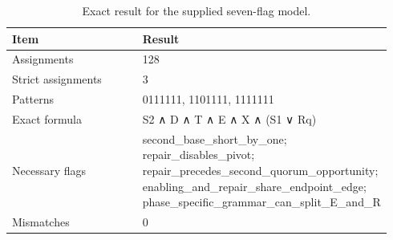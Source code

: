 \begin{table}[t]
\centering
\small
\begin{tabular}{p{0.470\linewidth}p{0.470\linewidth}}
\toprule
Item & Result \\
\midrule
Assignments & 128 \\
Strict assignments & 3 \\
Patterns & 0111111, 1101111, 1111111 \\
Exact formula & S2 ∧ D ∧ T ∧ E ∧ X ∧ (S1 ∨ Rq) \\
Necessary flags & second\_base\_short\_by\_one; repair\_disables\_pivot; repair\_precedes\_second\_quorum\_opportunity; enabling\_and\_repair\_share\_endpoint\_edge; phase\_specific\_grammar\_can\_split\_E\_and\_R \\
Mismatches & 0 \\
\bottomrule
\end{tabular}
\caption{Exact result for the supplied seven-flag model.}
\label{tab:table3_premise_characterization}
\end{table}
